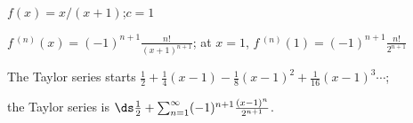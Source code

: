 {$f(x) = x/(x+1)$;\quad $c=1$
}
{$f\,^{(n)}(x) = (-1)^{n+1}\frac{n!}{(x+1)^{n+1}}$; at $x=1$, $f\,^{(n)}(1)=(-1)^{n+1}\frac{n!}{2^{n+1}}$

The Taylor series starts $\frac12+\frac14(x-1)-\frac18(x-1)^2+\frac1{16}(x-1)^3\cdots$; 

the Taylor series is $\ds \frac12+\sum_{n=1}^\infty (-1)^{n+1}\frac{(x-1)^n}{2^{n+1}}$.
}